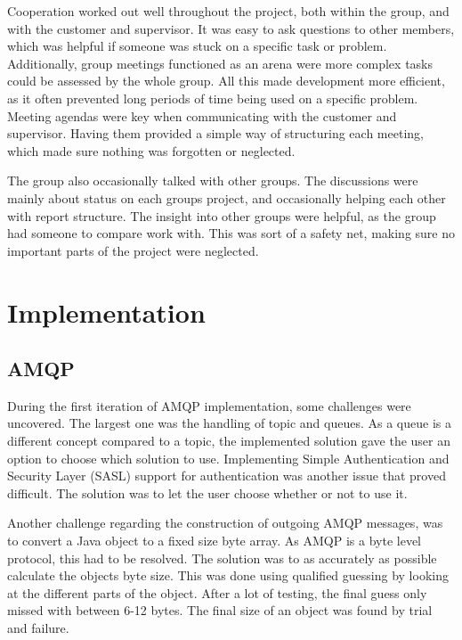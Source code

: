 Cooperation worked out well throughout the project, both within the group, and with the customer and supervisor. It was easy to ask questions to other members, which was helpful if someone was stuck on a specific task or problem. Additionally, group meetings functioned as an arena were more complex tasks could be assessed by the whole group. All this made development more efficient, as it often prevented long periods of time being used on a specific problem. Meeting agendas were key when communicating with the customer and supervisor. Having them provided a simple way of structuring each meeting, which made sure nothing was forgotten or neglected.

The group also occasionally talked with other groups. The discussions were mainly about status on each groups project, and occasionally helping each other with report structure. The insight into other groups were helpful, as the group had someone to compare work with. This was sort of a safety net, making sure no important parts of the project were neglected.

\section{Implementation}
\label{sec:Implementation}

\subsection{AMQP}
\label{subsec:Implementation_AMQP}

During the first iteration of AMQP implementation, some challenges were uncovered. The largest one was the handling of topic and queues. As a queue is a different concept compared to a topic, the implemented solution gave the user an option to choose which solution to use. Implementing Simple Authentication and Security Layer (SASL) support for authentication was another issue that proved difficult. The solution was to let the user choose whether or not to use it.

Another challenge regarding the construction of outgoing AMQP messages, was to convert a Java object to a fixed size byte array. As AMQP is a byte level protocol, this had to be resolved. The solution was to as accurately as possible calculate the objects byte size. This was done using qualified guessing by looking at the different parts of the object. After a lot of testing, the final guess only missed with between 6-12 bytes. The final size of an object was found by trial and failure.

